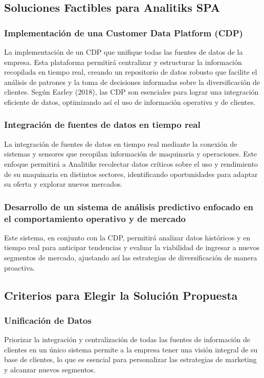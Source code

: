 \documentclass[12pt]{article}
\begin{document}
\subsection{Soluciones Factibles para Analitiks SPA}
\subsubsection{Implementación de una Customer Data Platform (CDP)}
\noindent
La implementación de un CDP que unifique todas las fuentes de datos de la empresa. Esta plataforma permitirá centralizar y estructurar la información recopilada en tiempo real, creando un repositorio de datos robusto que facilite el análisis de patrones y la toma de decisiones informadas sobre la diversificación de clientes. Según Earley (2018), las CDP son esenciales para lograr una integración eficiente de datos, optimizando así el uso de información operativa y de clientes.

\subsubsection{Integración de fuentes de datos en tiempo real}
\noindent
La integración de fuentes de datos en tiempo real mediante la conexión de sistemas y sensores que recopilan información de maquinaria y operaciones. Este enfoque permitirá a Analitiks recolectar datos críticos sobre el uso y rendimiento de su maquinaria en distintos sectores, identificando oportunidades para adaptar su oferta y explorar nuevos mercados.

\subsubsection{Desarrollo de un sistema de análisis predictivo enfocado en el comportamiento operativo y de mercado}
\noindent
Este sistema, en conjunto con la CDP, permitirá analizar datos históricos y en tiempo real para anticipar tendencias y evaluar la viabilidad de ingresar a nuevos segmentos de mercado, ajustando así las estrategias de diversificación de manera proactiva.

\subsection{Criterios para Elegir la Solución Propuesta}
\subsubsection{Unificación de Datos}
\noindent
Priorizar la integración y centralización de todas las fuentes de información de clientes en un único sistema permite a la empresa tener una visión integral de su base de clientes, lo que es esencial para personalizar las estrategias de marketing y alcanzar nuevos segmentos.
\end{document}
